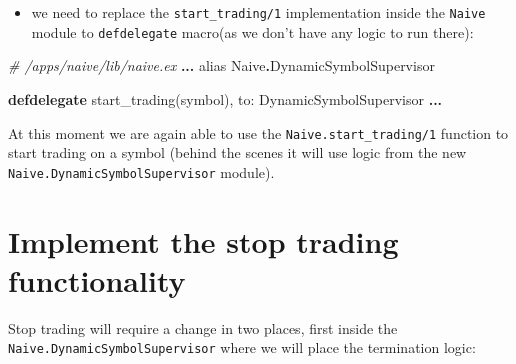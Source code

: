\documentclass[
]{book}
\newenvironment{Shaded}{\begin{snugshade}}{\end{snugshade}}
\newcommand{\CommentTok}[1]{\textcolor[rgb]{0.56,0.35,0.01}{\textit{#1}}}
\newcommand{\ConstantTok}[1]{\textcolor[rgb]{0.00,0.00,0.00}{#1}}
\newcommand{\ImportTok}[1]{#1}
\newcommand{\KeywordTok}[1]{\textcolor[rgb]{0.13,0.29,0.53}{\textbf{#1}}}
\newcommand{\NormalTok}[1]{#1}
\newcommand{\OperatorTok}[1]{\textcolor[rgb]{0.81,0.36,0.00}{\textbf{#1}}}
\newcommand{\VariableTok}[1]{\textcolor[rgb]{0.00,0.00,0.00}{#1}}
\providecommand{\tightlist}{%
  \setlength{\itemsep}{0pt}\setlength{\parskip}{0pt}}
\begin{document}
\begin{itemize}
\tightlist
\item
  we need to replace the \texttt{start\_trading/1} implementation inside the \texttt{Naive} module to \texttt{defdelegate} macro(as we don't have any logic to run there):
\end{itemize}

\begin{Shaded}
\begin{Highlighting}[]
\CommentTok{\# /apps/naive/lib/naive.ex}
\OperatorTok{...}
  \ImportTok{alias} \ConstantTok{Naive}\OperatorTok{.}\ConstantTok{DynamicSymbolSupervisor}

  \KeywordTok{defdelegate}\NormalTok{ start\_trading(symbol), }\VariableTok{to:} \ConstantTok{DynamicSymbolSupervisor}
\OperatorTok{...}
\end{Highlighting}
\end{Shaded}

At this moment we are again able to use the \texttt{Naive.start\_trading/1} function to start trading on a symbol (behind the scenes it will use logic from the new \texttt{Naive.DynamicSymbolSupervisor} module).

\hypertarget{implement-the-stop-trading-functionality}{%
\section{Implement the stop trading functionality}\label{implement-the-stop-trading-functionality}}

Stop trading will require a change in two places, first inside the \texttt{Naive.DynamicSymbolSupervisor} where we will place the termination logic:
\end{document}
